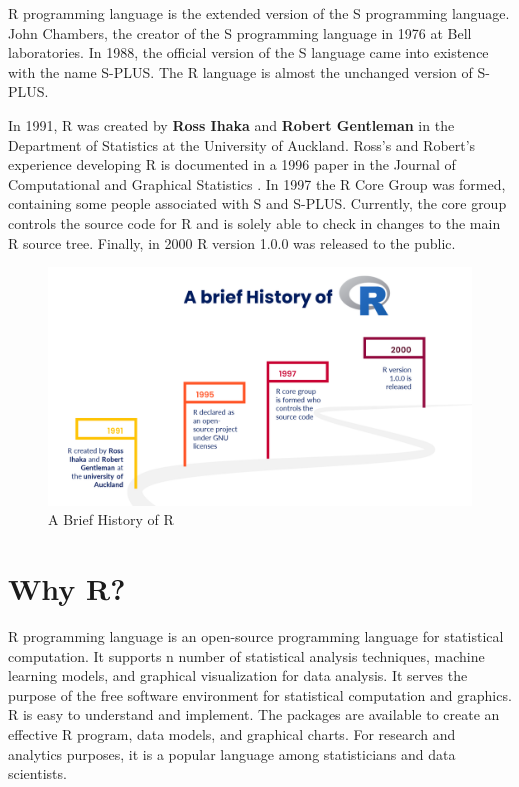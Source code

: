 \documentclass[
]{book}
\begin{document}
R programming language is the extended version of the S programming language. John Chambers, the creator of the S programming language in 1976 at Bell laboratories. In 1988, the official version of the S language came into existence with the name S-PLUS. The R language is almost the unchanged version of S-PLUS.

In 1991, R was created by \textbf{Ross Ihaka}  and \textbf{Robert Gentleman}  in the Department of Statistics at the University of Auckland. Ross's and Robert's experience developing R is documented in a 1996 paper in the Journal of Computational and Graphical Statistics \citep{10.2307/1390807}. In 1997 the R Core Group was formed, containing some people associated with S and S-PLUS. Currently, the core group controls the source code for R and is solely able to check in changes to the main R source tree. Finally, in 2000 R version 1.0.0 was released to the public. 

\begin{figure}

{\centering \includegraphics[width=0.9\linewidth]{images/history} 

}

\caption{A Brief History of R}\label{fig:history}
\end{figure}

\hypertarget{why-r}{%
\section*{Why R?}\label{why-r}}

R programming language is an open-source programming language for statistical computation. It supports n number of statistical analysis techniques, machine learning models, and graphical visualization for data analysis. It serves the purpose of the free software environment for statistical computation and graphics. R is easy to understand and implement. The packages are available to create an effective R program, data models, and graphical charts. For research and analytics purposes, it is a popular language among statisticians and data scientists.
\end{document}
